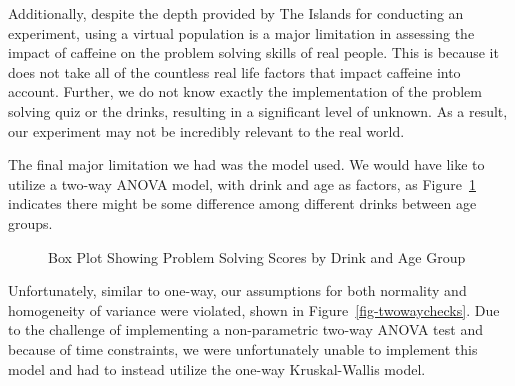 \documentclass[
  letterpaper,
  DIV=11,
  numbers=noendperiod]{scrartcl}
\begin{document}
Additionally, despite the depth provided by The Islands for conducting
an experiment, using a virtual population is a major limitation in
assessing the impact of caffeine on the problem solving skills of real
people. This is because it does not take all of the countless real life
factors that impact caffeine into account. Further, we do not know
exactly the implementation of the problem solving quiz or the drinks,
resulting in a significant level of unknown. As a result, our experiment
may not be incredibly relevant to the real world.

The final major limitation we had was the model used. We would have like
to utilize a two-way ANOVA model, with drink and age as factors, as
Figure~\ref{fig-dblboxplot} indicates there might be some difference
among different drinks between age groups.

\begin{figure}[H]


\caption{\label{fig-dblboxplot}Box Plot Showing Problem Solving Scores
by Drink and Age Group}

\end{figure}%

Unfortunately, similar to one-way, our assumptions for both normality
and homogeneity of variance were violated, shown in
Figure~\ref{fig-twowaychecks}. Due to the challenge of implementing a
non-parametric two-way ANOVA test and because of time constraints, we
were unfortunately unable to implement this model and had to instead
utilize the one-way Kruskal-Wallis model.
\end{document}
